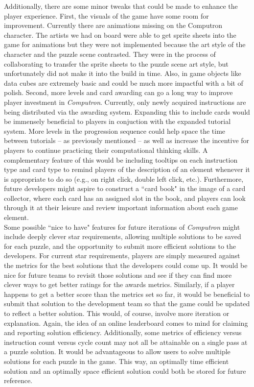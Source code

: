 Additionally, there are some minor tweaks that could be made to enhance the player experience. First, the visuals of the game have some room for improvement. Currently there are animations missing on the Computron character. The artists we had on board were able to get sprite sheets into the game for animations but they were not implemented because the art style of the character and the puzzle scene contrasted. They were in the process of collaborating to transfer the sprite sheets to the puzzle scene art style, but unfortunately did not make it into the build in time. Also, in game objects like data cubes are extremely basic and could be much more impactful with a bit of polish. Second, more levels and card awarding can go a long way to improve player investment in \textit{Computron}. Currently, only newly acquired instructions are being distributed via the awarding system. Expanding this to include cards would be immensely beneficial to players in conjuction with the expanded tutorial system. More levels in the progression sequence could help space the time between tutorials -- as previously mentioned -- as well as increase the incentive for players to continue practicing their computational thinking skills. A complementary feature of this would be including tooltips on each instruction type and card type to remind players of the description of an element whenever it is appropriate to do so (e.g., on right click, double left click, etc.). Furthermore, future developers might aspire to construct a  “card book" in the image of a card collector, where each card has an assigned slot in the book, and players can look through it at their leisure and review important information about each game element.\\

Some possible  “nice to have" features for future iterations of \textit{Computron} might include deeply clever star requirements, allowing multiple solutions to be saved for each puzzle, and the opportunity to submit more efficient solutions to the developers. For current star requirements, players are simply measured against the metrics for the best solutions that the developers could come up. It would be nice for future teams to revisit those solutions and see if they can find more clever ways to get better ratings for the awards metrics. Similarly, if a player happens to get a better score than the metrics set so far, it would be beneficial to submit that solution to the development team so that the game could be updated to reflect a better solution. This would, of course, involve more iteration or explanation. Again, the idea of an online leaderboard comes to mind for claiming and reporting solution efficiency. Additionally, some metrics of efficiency versus instruction count versus cycle count may not all be attainable on a single pass at a puzzle solution. It would be advantageous to allow users to solve multiple solutions for each puzzle in the game. This way, an optimally time efficient solution and an optimally space efficient solution could both be stored for future reference.\\

